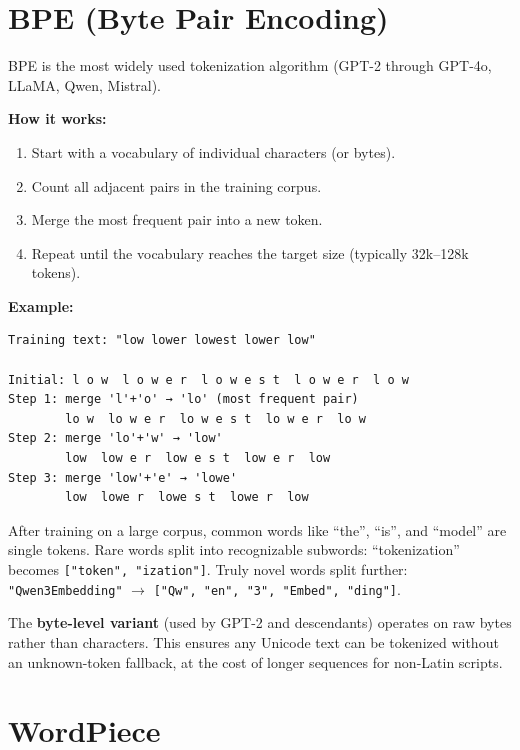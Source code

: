 \section{BPE (Byte Pair Encoding)}

BPE is the most widely used tokenization algorithm (GPT-2 through GPT-4o, LLaMA, Qwen, Mistral).

\textbf{How it works:}
\begin{enumerate}
    \item Start with a vocabulary of individual characters (or bytes).
    \item Count all adjacent pairs in the training corpus.
    \item Merge the most frequent pair into a new token.
    \item Repeat until the vocabulary reaches the target size (typically 32k--128k tokens).
\end{enumerate}

\textbf{Example:}

\begin{Verbatim}
Training text: "low lower lowest lower low"

Initial: l o w  l o w e r  l o w e s t  l o w e r  l o w
Step 1: merge 'l'+'o' → 'lo' (most frequent pair)
        lo w  lo w e r  lo w e s t  lo w e r  lo w
Step 2: merge 'lo'+'w' → 'low'
        low  low e r  low e s t  low e r  low
Step 3: merge 'low'+'e' → 'lowe'
        low  lowe r  lowe s t  lowe r  low
\end{Verbatim}

After training on a large corpus, common words like ``the'', ``is'', and ``model'' are single
tokens. Rare words split into recognizable subwords: ``tokenization'' becomes
\texttt{["token", "ization"]}. Truly novel words split further:
\texttt{"Qwen3Embedding"} $\to$ \texttt{["Qw", "en", "3", "Embed", "ding"]}.

The \textbf{byte-level variant} (used by GPT-2 and descendants) operates on raw bytes rather
than characters. This ensures any Unicode text can be tokenized without an unknown-token
fallback, at the cost of longer sequences for non-Latin scripts.

\section{WordPiece}

